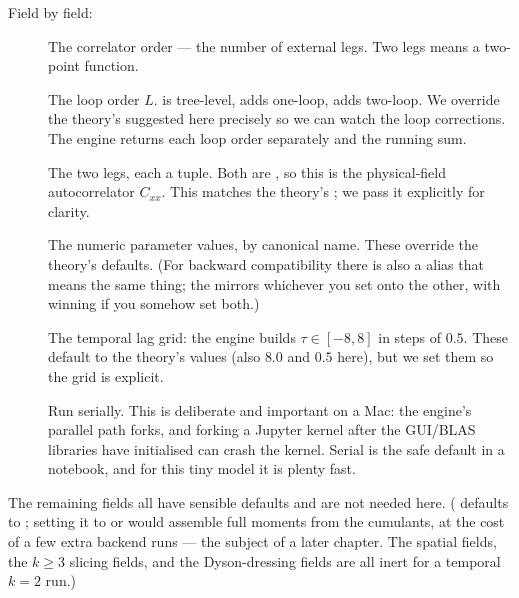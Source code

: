 Field by field:

\begin{description}
  \item[] The correlator order --- the number of external legs. Two
        legs means a two-point function.
  \item[] The loop order $L$.  is tree-level,
         adds one-loop,  adds two-loop. We override the theory's
        suggested  here precisely so we can watch the loop corrections.
        The engine returns each loop order separately and the running sum.
  \item[] The two legs, each a
         tuple. Both are , so this is the
        physical-field autocorrelator $C_{xx}$. This matches the theory's
        ; we pass it explicitly for clarity.
  \item[] The numeric parameter values, by canonical
        name. These override the theory's defaults. (For backward compatibility
        there is also a  alias that means the same thing; the
         mirrors whichever you set onto the
        other, with  winning if you somehow set both.)
  \item[] The temporal lag grid: the engine
        builds $\tau \in [-8, 8]$ in steps of $0.5$. These default to the
        theory's  values (also $8.0$ and $0.5$ here), but we set
        them so the grid is explicit.
  \item[] Run serially. This is deliberate and important on
        a Mac: the engine's parallel path forks, and forking a Jupyter kernel
        after the GUI/BLAS libraries have initialised can crash the kernel. Serial
        is the safe default in a notebook, and for this tiny model it is plenty
        fast.
\end{description}

The remaining  fields all have sensible defaults and are not needed
here. ( defaults to ; setting it to 
or  would assemble full moments from the cumulants, at the
cost of a few extra backend runs --- the subject of a later chapter. The spatial
fields, the $k\!\ge\!3$ slicing fields, and the Dyson-dressing fields are all
inert for a temporal $k=2$ run.)

